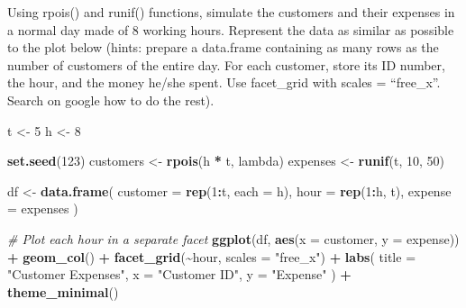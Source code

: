 \documentclass[
]{article}
\newenvironment{Shaded}{\begin{snugshade}}{\end{snugshade}}
\newcommand{\CommentTok}[1]{\textcolor[rgb]{0.56,0.35,0.01}{\textit{#1}}}
\newcommand{\DataTypeTok}[1]{\textcolor[rgb]{0.13,0.29,0.53}{#1}}
\newcommand{\DecValTok}[1]{\textcolor[rgb]{0.00,0.00,0.81}{#1}}
\newcommand{\KeywordTok}[1]{\textcolor[rgb]{0.13,0.29,0.53}{\textbf{#1}}}
\newcommand{\NormalTok}[1]{#1}
\newcommand{\OperatorTok}[1]{\textcolor[rgb]{0.81,0.36,0.00}{\textbf{#1}}}
\newcommand{\StringTok}[1]{\textcolor[rgb]{0.31,0.60,0.02}{#1}}
\begin{document}
Using rpois() and runif() functions, simulate the customers and their
expenses in a normal day made of 8 working hours. Represent the data as
similar as possible to the plot below (hints: prepare a data.frame
containing as many rows as the number of customers of the entire day.
For each customer, store its ID number, the hour, and the money he/she
spent. Use facet\_grid with scales = ``free\_x''. Search on google how
to do the rest).

\begin{Shaded}
\begin{Highlighting}[]
\NormalTok{t \textless{}{-}}\StringTok{ }\DecValTok{5}
\NormalTok{h \textless{}{-}}\StringTok{ }\DecValTok{8}

\KeywordTok{set.seed}\NormalTok{(}\DecValTok{123}\NormalTok{)}
\NormalTok{customers \textless{}{-}}\StringTok{ }\KeywordTok{rpois}\NormalTok{(h }\OperatorTok{*}\StringTok{ }\NormalTok{t, lambda)}
\NormalTok{expenses \textless{}{-}}\StringTok{ }\KeywordTok{runif}\NormalTok{(t, }\DecValTok{10}\NormalTok{, }\DecValTok{50}\NormalTok{)}

\NormalTok{df \textless{}{-}}\StringTok{ }\KeywordTok{data.frame}\NormalTok{(}
  \DataTypeTok{customer =} \KeywordTok{rep}\NormalTok{(}\DecValTok{1}\OperatorTok{:}\NormalTok{t, }\DataTypeTok{each =}\NormalTok{ h),}
  \DataTypeTok{hour =} \KeywordTok{rep}\NormalTok{(}\DecValTok{1}\OperatorTok{:}\NormalTok{h, t),}
  \DataTypeTok{expense =}\NormalTok{ expenses}
\NormalTok{)}

\CommentTok{\# Plot each hour in a separate facet}
\KeywordTok{ggplot}\NormalTok{(df, }\KeywordTok{aes}\NormalTok{(}\DataTypeTok{x =}\NormalTok{ customer, }\DataTypeTok{y =}\NormalTok{ expense)) }\OperatorTok{+}
\StringTok{  }\KeywordTok{geom\_col}\NormalTok{() }\OperatorTok{+}
\StringTok{  }\KeywordTok{facet\_grid}\NormalTok{(}\OperatorTok{\textasciitilde{}}\NormalTok{hour, }\DataTypeTok{scales =} \StringTok{"free\_x"}\NormalTok{) }\OperatorTok{+}
\StringTok{  }\KeywordTok{labs}\NormalTok{(}
    \DataTypeTok{title =} \StringTok{"Customer Expenses"}\NormalTok{,}
    \DataTypeTok{x =} \StringTok{"Customer ID"}\NormalTok{,}
    \DataTypeTok{y =} \StringTok{"Expense"}
\NormalTok{  ) }\OperatorTok{+}
\StringTok{  }\KeywordTok{theme\_minimal}\NormalTok{()}
\end{Highlighting}
\end{Shaded}
\end{document}
